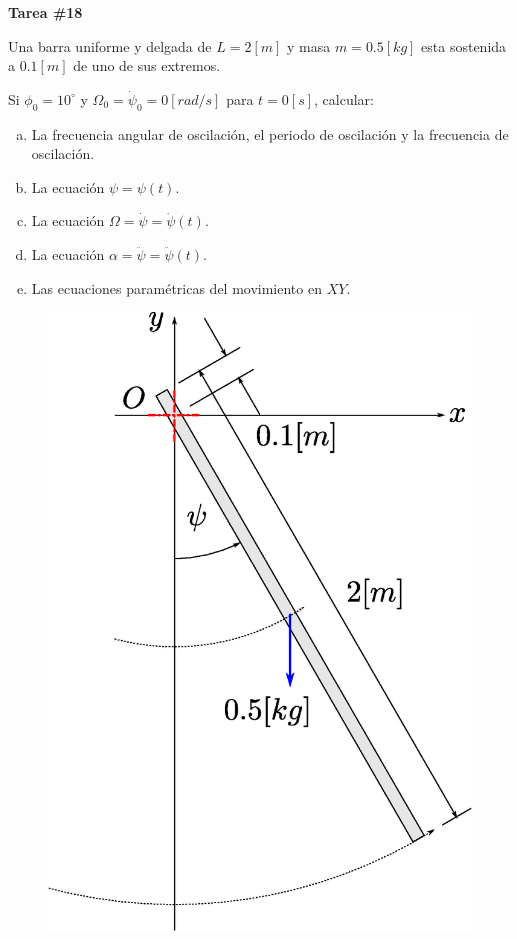 \documentclass[letter,11pt]{article}
\begin{document}
\begin{center}
    {\Large \bf{Tarea \#18}}
\end{center}

Una barra uniforme y delgada de $L = 2[m]$ y masa $m = 0.5 [kg]$ esta
sostenida a $0.1 [m]$ de uno de sus extremos.

Si $\phi_0 = 10^\circ$ y $\Omega_0 = \dot{\psi}_0 = 0 [rad/s]$ para $t = 0 [s]$,
calcular:

\begin{enumerate}[a)]
    \item La frecuencia angular de oscilación, el periodo de oscilación y la
        frecuencia de oscilación.
    \item La ecuación $\psi = \psi(t)$.
    \item La ecuación $\Omega = \dot{\psi} = \dot{\psi}(t)$.
    \item La ecuación $\alpha = \ddot{\psi} = \ddot{\psi}(t)$.
    \item Las ecuaciones paramétricas del movimiento en $XY$.
\end{enumerate}

\begin{figure}[!h]
\centering
\includegraphics[scale=0.45]{resources/f1.eps}
\end{figure}
\end{document}
